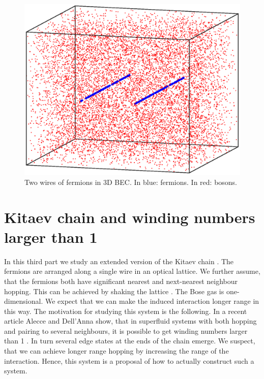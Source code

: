 \documentclass[11pt, twoside]{Thesis}
\begin{document}
\vspace{2.5cm}

\begin{figure}[H]
\center
\includegraphics[width=0.8\columnwidth]{gasandwires3.eps}
\\ Two wires of fermions in 3D BEC. In blue: fermions. In red: bosons.  
\end{figure}

\newpage


 
 
 

\part{Kitaev chain and winding numbers larger than 1}
In this third part we study an extended version of the Kitaev chain \cite{KitaevQuantumWires}. The fermions are arranged along a single wire in an optical lattice. We further assume, that the fermions both have significant nearest and next-nearest neighbour hopping. This can be achieved by shaking the lattice \cite{Liberto.ShakingOpticalLattice}. The Bose gas is one-dimensional. We expect that we can make the induced interaction longer range in this way. The motivation for studying this system is the following. In a recent article Alecce and Dell'Anna show, that in superfluid systems with both hopping and pairing to several neighbours, it is possible to get winding numbers larger than 1 \cite{Alecce.extendKitaev}. In turn several edge states at the ends of the chain emerge. We suspect, that we can achieve longer range hopping by increasing the range of the interaction. Hence, this system is a proposal of how to actually construct such a system. 
\end{document}
